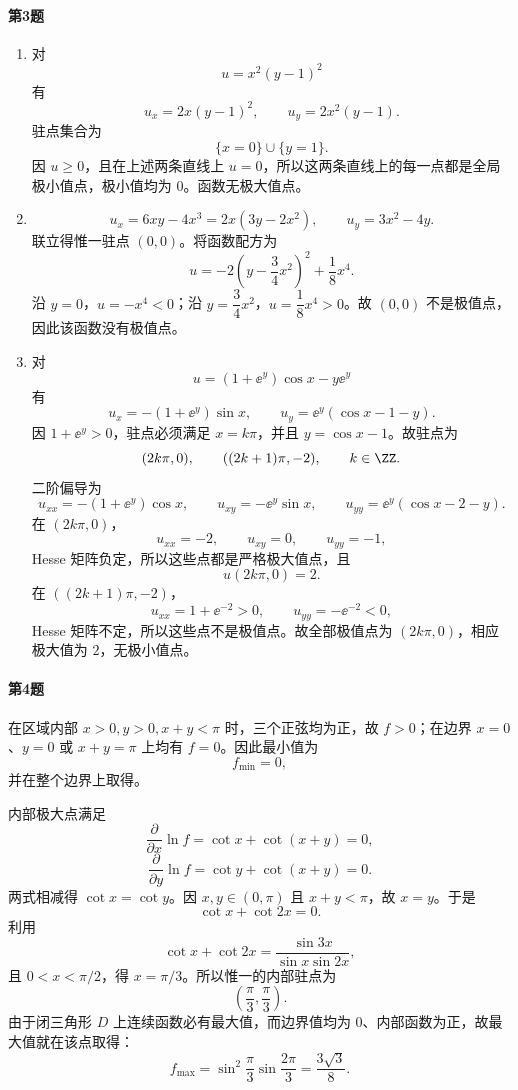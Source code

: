 \paragraph{第3题}
\begin{xsolution}
\begin{enumerate}[label=(\arabic*)]
  \item 对
  \[
    u=x^2(y-1)^2
  \]
  有
  \[
    u_x=2x(y-1)^2,
    \qquad
    u_y=2x^2(y-1).
  \]
  驻点集合为
  \[
    \{x=0\}\cup\{y=1\}.
  \]
  因 $u\ge0$，且在上述两条直线上 $u=0$，所以这两条直线上的每一点都是全局极小值点，极小值均为 $0$。函数无极大值点。

  \item
  \[
    u_x=6xy-4x^3=2x(3y-2x^2),
    \qquad
    u_y=3x^2-4y.
  \]
  联立得惟一驻点 $(0,0)$。将函数配方为
  \[
    u=-2\left(y-\frac34x^2\right)^2+\frac18x^4.
  \]
  沿 $y=0$，$u=-x^4<0$；沿 $y=\dfrac34x^2$，$u=\dfrac18x^4>0$。故 $(0,0)$ 不是极值点，因此该函数没有极值点。

  \item 对
  \[
    u=(1+\ee^y)\cos x-y\ee^y
  \]
  有
  \[
    u_x=-(1+\ee^y)\sin x,
    \qquad
    u_y=\ee^y(\cos x-1-y).
  \]
  因 $1+\ee^y>0$，驻点必须满足 $x=k\pi$，并且 $y=\cos x-1$。故驻点为
  \[
    (2k\pi,0),
    \qquad
    ((2k+1)\pi,-2),
    \qquad k\in\ZZ.
  \]
  二阶偏导为
  \[
    u_{xx}=-(1+\ee^y)\cos x,
    \qquad
    u_{xy}=-\ee^y\sin x,
    \qquad
    u_{yy}=\ee^y(\cos x-2-y).
  \]
  在 $(2k\pi,0)$，
  \[
    u_{xx}=-2,
    \qquad u_{xy}=0,
    \qquad u_{yy}=-1,
  \]
  Hesse 矩阵负定，所以这些点都是严格极大值点，且
  \[
    u(2k\pi,0)=2.
  \]
  在 $((2k+1)\pi,-2)$，
  \[
    u_{xx}=1+\ee^{-2}>0,
    \qquad
    u_{yy}=-\ee^{-2}<0,
  \]
  Hesse 矩阵不定，所以这些点不是极值点。故全部极值点为 $(2k\pi,0)$，相应极大值为 $2$，无极小值点。
\end{enumerate}
\end{xsolution}

\paragraph{第4题}
\begin{xsolution}
在区域内部 $x>0,y>0,x+y<\pi$ 时，三个正弦均为正，故 $f>0$；在边界 $x=0$、$y=0$ 或 $x+y=\pi$ 上均有 $f=0$。因此最小值为
\[
  f_{\min}=0,
\]
并在整个边界上取得。

内部极大点满足
\[
  \frac{\partial}{\partial x}\ln f
  =\cot x+\cot(x+y)=0,
\]
\[
  \frac{\partial}{\partial y}\ln f
  =\cot y+\cot(x+y)=0.
\]
两式相减得 $\cot x=\cot y$。因 $x,y\in(0,\pi)$ 且 $x+y<\pi$，故 $x=y$。于是
\[
  \cot x+\cot2x=0.
\]
利用
\[
  \cot x+\cot2x
  =\frac{\sin3x}{\sin x\sin2x},
\]
且 $0<x<\pi/2$，得 $x=\pi/3$。所以惟一的内部驻点为
\[
  \left(\frac\pi3,\frac\pi3\right).
\]
由于闭三角形 $D$ 上连续函数必有最大值，而边界值均为 $0$、内部函数为正，故最大值就在该点取得：
\[
  f_{\max}
  =\sin^2\frac\pi3\sin\frac{2\pi}3
  =\frac{3\sqrt3}{8}.
\]
\end{xsolution}

